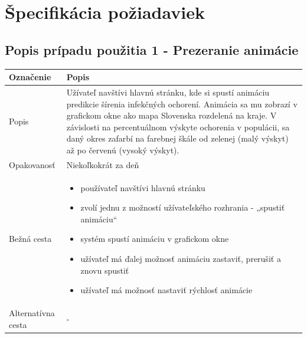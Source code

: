 \documentclass[12pt,a4paper]{report}
\begin{document}
\renewcommand{\chaptername}{}	
\chapter[Špecifikácia požiadaviek]{\rmfamily\bfseries
	Špecifikácia požiadaviek}
\section[Popis prípadu použitia 1 - Prezeranie animácie]{\rmfamily\bfseries
	Popis prípadu použitia 1 - Prezeranie animácie}
\begin{table}[h!]
	\centering
	\begin{tabular}{|>{\centering\arraybackslash}m{3in}|>{\centering\arraybackslash}m{3in}|}
		\hline
		\centering Označenie & Popis \\ [0ex]
		\hline
		Popis & Užívateľ navštívi hlavnú stránku, kde si spustí animáciu predikcie šírenia infekčných ochorení. Animácia sa mu
		zobrazí v grafickom okne ako mapa Slovenska rozdelená na kraje. V závislosti na percentuálnom výskyte ochorenia
		v populácii, sa daný okres zafarbí na farebnej škále od zelenej (malý výskyt) až po červenú (vysoký výskyt).\\ [0ex]
		\hline
		Opakovanosť & Niekoľkokrát za deň \\ [0ex]
		\hline
		Bežná cesta & 	\begin{itemize}
			\item používateľ navštívi hlavnú stránku 
			\item zvolí jednu z možností užívateľského rozhrania - „spustiť animáciu“
			\item systém spustí animáciu v grafickom okne
			\item užívateľ má ďalej možnosť animáciu zastaviť, prerušiť a znovu spustiť
			\item užívateľ má možnosť nastaviť rýchlosť animácie
		\end{itemize} \\ [0ex]
		\hline
		Alternatívna cesta & - \\ [0ex]
		\hline
	\end{tabular}
\end{table}
\pagebreak
\end{document}
